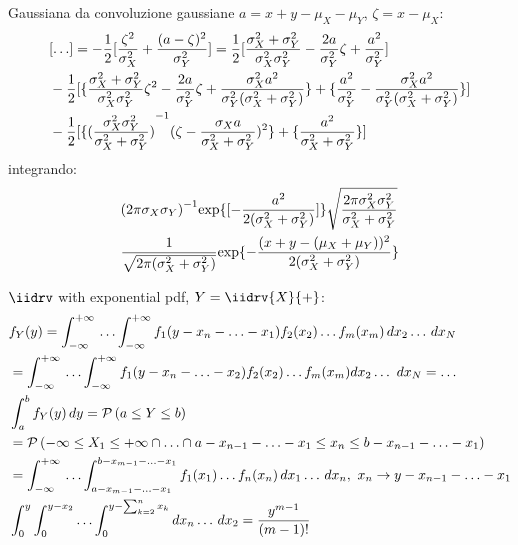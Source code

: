 \documentclass[asd-beamer.tex]{subfiles}%
\begin{document}
\begin{wordonframe}{Gaussiana da convoluzione gaussiane}
    $a=x+y-\mu_X-\mu_Y$, $\zeta=x-\mu_X$:
    \begin{align*}
        &[\ldots]=-\frac{1}{2}[\frac{\zeta^2}{\sigma_X^2}+\frac{(a-\zeta)^2}{\sigma_Y^2}]=\frac{1}{2}[\frac{\sigma_X^2+\sigma_Y^2}{\sigma_X^2\sigma_Y^2}-\frac{2a}{\sigma_Y^2}\zeta+\frac{a^2}{\sigma_Y^2}]\\
        &-\frac{1}{2}[\{\frac{\sigma_X^2+\sigma_Y^2}{\sigma_X^2\sigma_Y^2}\zeta^2-\frac{2a}{\sigma_Y^2}\zeta+\frac{\sigma_X^2a^2}{\sigma_Y^2(\sigma_X^2+\sigma_Y^2)}\}+\{\frac{a^2}{\sigma_Y^2}-\frac{\sigma_X^2a^2}{\sigma_Y^2(\sigma_X^2+\sigma_Y^2)}\}]\\
        &-\frac{1}{2}[\{{(\frac{\sigma_X^2\sigma_Y^2}{\sigma_X^2+\sigma_Y^2})}^{-1}(\zeta-\frac{\sigma_Xa}{\sigma_X^2+\sigma_Y^2})^2\}+\{\frac{a^2}{\sigma_X^2+\sigma_Y^2}\}]
    \end{align*}
    integrando:
    \begin{align*}
        &{(2\pi\sigma_X\sigma_Y)}^{-1}\text{exp}\{[-\frac{a^2}{2(\sigma_X^2+\sigma_Y^2)}]\}\sqrt{\frac{2\pi\sigma_X^2\sigma_Y^2}{\sigma_X^2+\sigma_Y^2}}\\
        &\frac{1}{\sqrt{2\pi(\sigma_X^2+\sigma_Y^2)}}\text{exp}\{-\frac{(x+y-(\mu_X+\mu_Y))^2}{2(\sigma_X^2+\sigma_Y^2)}\}
    \end{align*}
\end{wordonframe}

\begin{wordonframe}{}
    $\iidrv$ with exponential pdf, $Y=\iidrv{X}{+}$:
\begin{align*}
&f_Y(y)=\int_{-\infty}^{+\infty}{}\ldots\int_{-\infty}^{+\infty} f_1(y-x_n-\ldots-x_1)f_2(x_2)\ldots f_m(x_m)\,dx_2\ldots\,dx_N\\
&=\int_{-\infty}^{+\infty}{}\ldots\int_{-\infty}^{+\infty} f_1(y-x_n-\ldots-x_2)f_2(x_2)\ldots f_m(x_m)dx_2\ldots\ dx_N=\ldots\\
&\int_a^bf_Y(y)\,dy=\operatorname{\mathcal{P}}{(a\leq Y\leq b)}\\
&=\operatorname{\mathcal{P}}{(-\infty\leq X_1\leq+\infty\cap\ldots\cap a-x_{n-1}-\ldots-x_1\leq x_n\leq b-x_{n-1}-\ldots-x_1)}\\
&=\int_{-\infty}^{+\infty}{}\ldots\int_{a-x_{m-1}-\ldots-x_1}^{b-x_{m-1}-\ldots-x_1}f_1(x_1)\ldots f_n(x_n)\,dx_1\ldots\,dx_n,\ x_n\to y-x_{n-1}-\ldots-x_1\\
&\int_0^y\int_0^{y-x_2}\ldots\int_0^{y-\sum_{k=2}^nx_k}dx_n\ldots\,dx_{2}=\frac{y^{m-1}}{(m-1)!}
\end{align*}
\end{wordonframe}
\end{document}
